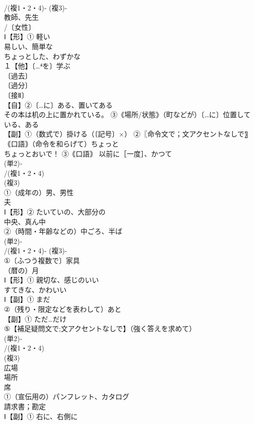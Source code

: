 \documentclass[8pt]{extreport}
\begin{document}
\begin{CJK}{UTF8}{min}
\\	/(複1・2・4)‐ (複3)‐
\\	教師、先生
\\	/〔女性〕
\\	Ⅰ【形】① 軽い 
\\	易しい、簡単な　
\\	ちょっとした、わずかな
\\	１【他】〔…⁴を〕学ぶ 
\\	〔過去〕
\\	〔過分〕
\\	〔接Ⅱ〕
\\	【自】②〔…に〕ある、置いてある 
\\	その本は机の上に置かれている。 ③《場所/状態》（町などが）〔…に〕位置している、ある
\\	【副】①（数式で）掛ける（〔記号〕×） ②〖命令文で；文アクセントなしで〗｟口語｠（命令を和らげて）ちょっと 
\\	ちょっとおいで！ ③｟口語｠ 以前に［一度］、かつて
\\	(単2)‐
\\	/(複1・2・4)
\\	(複3)
\\	①（成年の）男、男性
\\	夫
\\	Ⅰ【形】② たいていの、大部分の
\\	中央、真ん中
\\	②（時間・年齢などの）中ごろ、半ば
\\	(単2)‐
\\	/(複1・2・4)‐ (複3)‐
\\	①〔ふつう複数で〕家具
\\	（暦の）月 
\\	Ⅰ【形】① 親切な、感じのいい 
\\	すてきな、かわいい
\\	Ⅰ【副】① まだ 
\\	②（残り・限定などを表わして）あと
\\	【副】① ただ…だけ
\\	⑤【補足疑問文で;文アクセントなしで】（強く答えを求めて）
\\	(単2)‐
\\	/(複1・2・4)
\\	(複3)
\\	広場 
\\	場所　
\\	席
\\	①（宣伝用の）パンフレット、カタログ 
\\	請求書；勘定
\\	Ⅰ【副】① 右に、右側に

\end{CJK}
\end{document}
